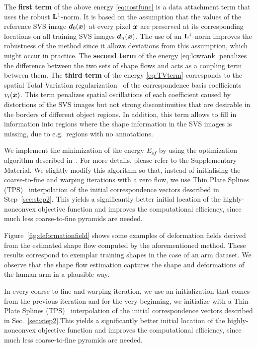 The \textbf{first term} of the above energy \eqref{eq:costfunc} is a data attachment term
that uses the robust $\mathbf{L}^1$-norm.  It is based on the assumption that the values of the reference SVS image $\bm{d}_0(\bm{x})$ at every pixel $\bm{x}$ are preserved at its corresponding locations on all training SVS images $\bm{d}_n(\bm{x})$. The use of an $\mathbf{L}^1$-norm improves the robustness of the method since it allows deviations from this assumption, which might occur in practice.
The \textbf{second term} of the energy \eqref{eq:lowrank} penalizes the difference between the two sets  of shape flows and acts as a coupling term between them.
The \textbf{third term} of the energy \eqref{eq:TVterm} corresponds to the spatial Total Variation regularization~\cite{rudin92} of
the correspondence basis coefficients $v_i(\bm{x})$.
This term penalizes spatial oscillations of each coefficient caused by distortions of the SVS images but not strong discontinuities that are desirable in the borders of different object regions. In addition, this term allows to fill in information into regions where the shape information in the SVS images is missing, due to e.g.~regions with no annotations.

We implement the minimization of the energy $E_{sf}$ by using the optimization algorithm described in~\cite{Garg:2013hu}. For more details, please refer to the Supplementary Material. We slightly modify this algorithm so that, instead of initialising the coarse-to-fine and warping iterations with a zero flow, we use Thin Plate Splines (TPS)~\cite{Bookstein1989} interpolation of the initial correspondence vectors described in Step~\ref{sec:step2}. This yields a significantly better initial location of the highly-nonconvex objective function and improves the computational efficiency, since much less coarse-to-fine pyramids are needed.

Figure~\ref{fig:deformationfield} shows some examples of deformation fields derived from the estimated shape flow computed by the aforementioned method. These results correspond to exemplar training shapes in the case of an arm dataset. We observe that the shape flow estimation captures the shape and deformations of the human arm in a plausible way.

In every coarse-to-fine and warping iteration, we use an initialization that comes from the previous iteration and for the very beginning, we initialize with a Thin Plate Splines (TPS)~\cite{Bookstein1989} interpolation of the initial correspondence vectors described in Sec.~\ref{sec:step2}.This yields a significantly better initial location of the highly-nonconvex objective function and improves the computational efficiency, since much less coarse-to-fine pyramids are needed. 

